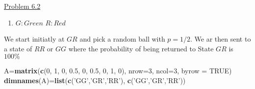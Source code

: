 \documentclass[]{article}
\newenvironment{Shaded}{\begin{snugshade}}{\end{snugshade}}
\newcommand{\DataTypeTok}[1]{\textcolor[rgb]{0.13,0.29,0.53}{#1}}
\newcommand{\DecValTok}[1]{\textcolor[rgb]{0.00,0.00,0.81}{#1}}
\newcommand{\FloatTok}[1]{\textcolor[rgb]{0.00,0.00,0.81}{#1}}
\newcommand{\KeywordTok}[1]{\textcolor[rgb]{0.13,0.29,0.53}{\textbf{#1}}}
\newcommand{\NormalTok}[1]{#1}
\newcommand{\OperatorTok}[1]{\textcolor[rgb]{0.81,0.36,0.00}{\textbf{#1}}}
\newcommand{\OtherTok}[1]{\textcolor[rgb]{0.56,0.35,0.01}{#1}}
\newcommand{\StringTok}[1]{\textcolor[rgb]{0.31,0.60,0.02}{#1}}
\providecommand{\tightlist}{%
  \setlength{\itemsep}{0pt}\setlength{\parskip}{0pt}}
\begin{document}
\underline{Problem 6.2}

\begin{enumerate}
\def\labelenumi{\alph{enumi})}
\tightlist
\item
  \(G: Green\) \(R: Red\)
\end{enumerate}

We start initiatly at \(GR\) and pick a random ball with \(p=1/2\). We
ar then sent to a state of \(RR\) or \(GG\) where the probability of
being returned to State \(GR\) is \(100\%\)

\begin{Shaded}
\begin{Highlighting}[]
\NormalTok{A=}\KeywordTok{matrix}\NormalTok{(}\KeywordTok{c}\NormalTok{(}\DecValTok{0}\NormalTok{, }\DecValTok{1}\NormalTok{, }\DecValTok{0}\NormalTok{, }\FloatTok{0.5}\NormalTok{, }\DecValTok{0}\NormalTok{, }\FloatTok{0.5}\NormalTok{, }\DecValTok{0}\NormalTok{, }\DecValTok{1}\NormalTok{, }\DecValTok{0}\NormalTok{), }\DataTypeTok{nrow=}\DecValTok{3}\NormalTok{, }\DataTypeTok{ncol=}\DecValTok{3}\NormalTok{, }\DataTypeTok{byrow =} \OtherTok{TRUE}\NormalTok{)}
\KeywordTok{dimnames}\NormalTok{(A)=}\KeywordTok{list}\NormalTok{(}\KeywordTok{c}\NormalTok{(}\StringTok{'GG'}\NormalTok{,}\StringTok{'GR'}\NormalTok{,}\StringTok{'RR'}\NormalTok{), }\KeywordTok{c}\NormalTok{(}\StringTok{'GG'}\NormalTok{,}\StringTok{'GR'}\NormalTok{,}\StringTok{'RR'}\NormalTok{))}
\end{Highlighting}
\end{Shaded}

\begin{Shaded}
\end{Shaded}
\end{document}
